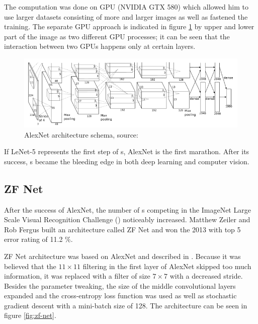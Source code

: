 The computation was done on GPU (NVIDIA GTX 580) which allowed him to use larger 
datasets consisting of more and larger images as well as fastened the training. 
The separate GPU approach is indicated in figure \ref{fig:alexnet} by upper and 
lower part of the image as two different GPU processes; it can be seen that the 
interaction between two GPUs happens only at certain layers. 

\begin{figure}[H]
   \centering
	\includegraphics[width=\linewidth]{./pictures/alexnet.png}
	\caption[AlexNet architecture]{AlexNet architecture schema, source: 
\cite{cnn-classification}}
      \label{fig:alexnet}
\end{figure}

If LeNet-5 represents the first step of s, AlexNet is the first 
marathon. After its success, s became the bleeding edge in both deep 
learning and computer vision. 


\subsection{ZF Net}
\label{zfnet}

After the success of AlexNet, the number of s competing in the ImageNet 
Large Scale Visual Recognition Challenge () noticeably increased. 
Matthew Zeiler and Rob Fergus built an architecture called ZF Net and won the 
 2013 with top 5 error rating of 11.2 \%. 

ZF Net architecture was based on AlexNet and described in \cite{zf-net}. Because 
it was believed that the $11 \times 11$ filtering in the first layer of AlexNet 
skipped too much information, it was replaced with a filter of size $7 \times 7$ 
with a decreased stride. Besides the parameter tweaking, the size of the middle 
convolutional layers expanded and the cross-entropy loss function was used as 
well as stochastic gradient descent with a mini-batch size of 128. The 
architecture can be seen in figure \ref{fig:zf-net}.

